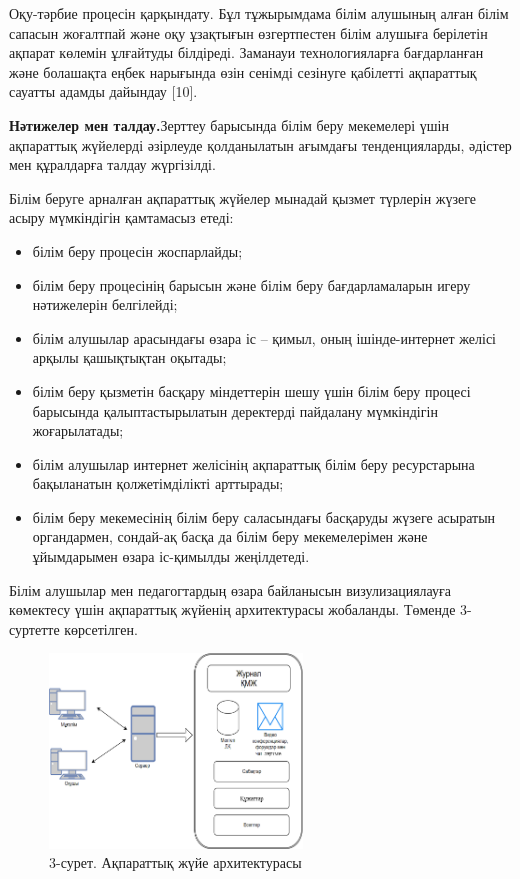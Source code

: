 \begin{multicols}{2}
Оқу-тәрбие процесін қарқындату. Бұл тұжырымдама білім алушының алған
білім сапасын жоғалтпай және оқу ұзақтығын өзгертпестен білім алушыға
берілетін ақпарат көлемін ұлғайтуды білдіреді. Заманауи технологияларға
бағдарланған және болашақта еңбек нарығында өзін сенімді сезінуге
қабілетті ақпараттық сауатты адамды дайындау {[}10{]}.

{\bfseries Нәтижелер мен талдау.}Зерттеу барысында білім беру мекемелері
үшін ақпараттық жүйелерді әзірлеуде қолданылатын ағымдағы
тенденцияларды, әдістер мен құралдарға талдау жүргізілді.

Білім беруге арналған ақпараттық жүйелер мынадай қызмет түрлерін жүзеге
асыру мүмкіндігін қамтамасыз етеді:

\begin{itemize}
\item
  білім беру процесін жоспарлайды;
\item
  білім беру процесінің барысын және білім беру бағдарламаларын игеру
  нәтижелерін белгілейді;
\item
  білім алушылар арасындағы өзара іс -- қимыл, оның ішінде-интернет
  желісі арқылы қашықтықтан оқытады;
\item
  білім беру қызметін басқару міндеттерін шешу үшін білім беру процесі
  барысында қалыптастырылатын деректерді пайдалану мүмкіндігін
  жоғарылатады;
\item
  білім алушылар интернет желісінің ақпараттық білім беру ресурстарына
  бақыланатын қолжетімділікті арттырады;
\item
  білім беру мекемесінің білім беру саласындағы басқаруды жүзеге
  асыратын органдармен, сондай-ақ басқа да білім беру мекемелерімен және
  ұйымдарымен өзара іс-қимылды жеңілдетеді.
\end{itemize}

Білім алушылар мен педагогтардың өзара байланысын визулизациялауға
көмектесу үшін ақпараттық жүйенің архитектурасы жобаланды. Төменде
3-суртетте көрсетілген.
\end{multicols}

\begin{figure}[H]
	\centering
	\includegraphics[width=0.6\textwidth]{media/ict/image101}
	\caption*{3-сурет. Ақпараттық жүйе архитектурасы}
\end{figure}

